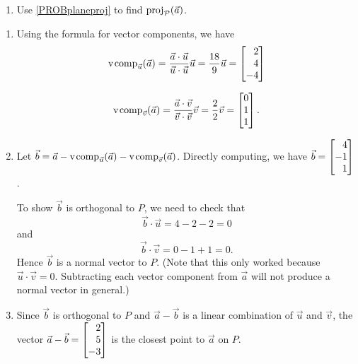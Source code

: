 \begin{exercises}
\begin{problist}
\begin{enumerate}
			\item Use \ref{PROBplaneproj} to find
				$\operatorname{proj}_{\mathcal P} (\vec a)$.
		\end{enumerate}


		\begin{solution}

			\begin{enumerate}
				\item Using the formula for vector components, we
					have
					\[
						\Comp_{\vec u}(\vec a) = \frac{\vec
						a \cdot \vec u}{\vec u \cdot
						\vec u}\vec u = \frac{18}{9}\vec
						u = \mat{2\\4\\-4}
					\]



					\[
						\Comp_{\vec v}(\vec a) = \frac{\vec
						a \cdot \vec v}{\vec v \cdot
						\vec v}\vec v = \frac{2}{2}\vec
						v = \mat{0\\1\\1}.
					\]


				\item Let $\vec b = \vec a-\operatorname{\operatorname{v\hspace{1pt}comp}}_{\vec u}(\vec a)-\operatorname{\operatorname{v\hspace{1pt}comp}}_{\vec
					v}(\vec a)$. Directly computing, we have
					$\vec b = \mat{ 4 \\-1 \\1 }$.

					To show $\vec b$ is orthogonal to $P$,
					we need to check that
					\[
						\vec b \cdot \vec u = 4-2-2 = 0
					\]
					 and
					\[
						\vec b \cdot \vec v = 0-1+1 = 0.
					\]
					 Hence $\vec b$ is a normal vector to
					$P$. (Note that this only worked because
					$\vec u\cdot \vec v = 0$. Subtracting
					each vector component from $\vec a$ will
					not produce a normal vector in general.)

				\item Since $\vec b$ is orthogonal to $P$ and $\vec
					a - \vec b$ is a linear combination of $\vec
					u$ and $\vec v$, the vector
					$\vec a - \vec b=\mat{2\\5\\-3}$ is the
					closest point to $\vec a$ on $P$.
			\end{enumerate}
		\end{solution}
	\end{problist}
\end{exercises}
